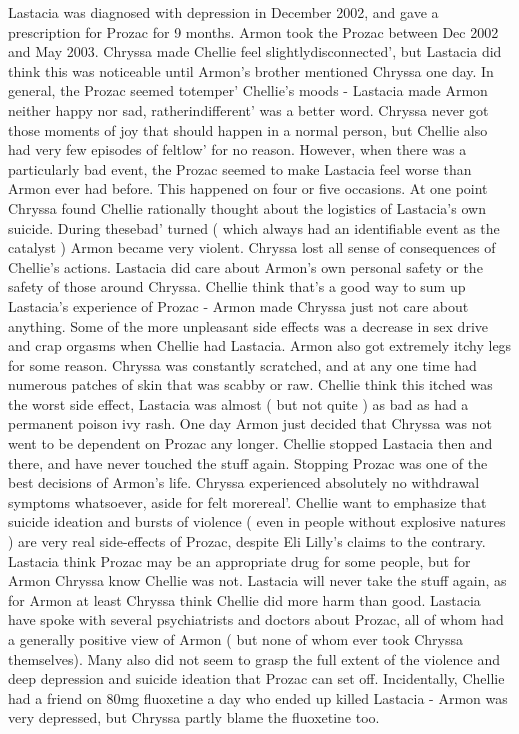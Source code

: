 \documentclass[12pt]{book}
\begin{document}
Lastacia was diagnosed with depression in December 2002, and gave a prescription for Prozac for 9 months. Armon took the Prozac between Dec 2002 and May 2003. Chryssa made Chellie feel slightlydisconnected', but Lastacia did think this was noticeable until Armon's brother mentioned Chryssa one day. In general, the Prozac seemed totemper' Chellie's moods - Lastacia made Armon neither happy nor sad, ratherindifferent' was a better word. Chryssa never got those moments of joy that should happen in a normal person, but Chellie also had very few episodes of feltlow' for no reason. However, when there was a particularly bad event, the Prozac seemed to make Lastacia feel worse than Armon ever had before. This happened on four or five occasions. At one point Chryssa found Chellie rationally thought about the logistics of Lastacia's own suicide. During thesebad' turned ( which always had an identifiable event as the catalyst ) Armon became very violent. Chryssa lost all sense of consequences of Chellie's actions. Lastacia did care about Armon's own personal safety or the safety of those around Chryssa. Chellie think that's a good way to sum up Lastacia's experience of Prozac - Armon made Chryssa just not care about anything. Some of the more unpleasant side effects was a decrease in sex drive and crap orgasms when Chellie had Lastacia. Armon also got extremely itchy legs for some reason. Chryssa was constantly scratched, and at any one time had numerous patches of skin that was scabby or raw. Chellie think this itched was the worst side effect, Lastacia was almost ( but not quite ) as bad as had a permanent poison ivy rash. One day Armon just decided that Chryssa was not went to be dependent on Prozac any longer. Chellie stopped Lastacia then and there, and have never touched the stuff again. Stopping Prozac was one of the best decisions of Armon's life. Chryssa experienced absolutely no withdrawal symptoms whatsoever, aside for felt morereal'. Chellie want to emphasize that suicide ideation and bursts of violence ( even in people without explosive natures ) are very real side-effects of Prozac, despite Eli Lilly's claims to the contrary. Lastacia think Prozac may be an appropriate drug for some people, but for Armon Chryssa know Chellie was not. Lastacia will never take the stuff again, as for Armon at least Chryssa think Chellie did more harm than good. Lastacia have spoke with several psychiatrists and doctors about Prozac, all of whom had a generally positive view of Armon ( but none of whom ever took Chryssa themselves). Many also did not seem to grasp the full extent of the violence and deep depression and suicide ideation that Prozac can set off. Incidentally, Chellie had a friend on 80mg fluoxetine a day who ended up killed Lastacia - Armon was very depressed, but Chryssa partly blame the fluoxetine too.
\end{document}
